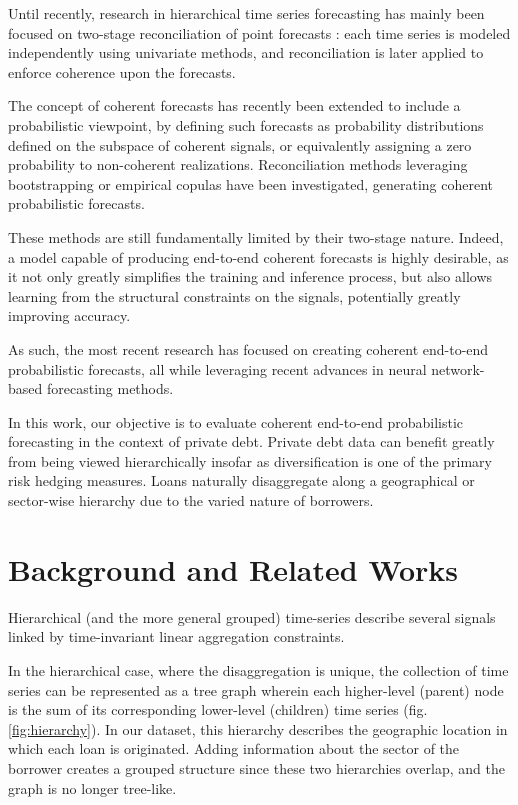 \documentclass[letterpaper]{article}
\begin{document}
Until recently, research in hierarchical time series forecasting has mainly been focused on two-stage reconciliation of point forecasts : each time series is modeled independently using univariate methods, and reconciliation is later applied to enforce coherence upon the forecasts.

The concept of coherent forecasts has recently been extended to include a probabilistic viewpoint, by defining such forecasts as probability distributions defined on the subspace of coherent signals, or equivalently assigning a zero probability to non-coherent realizations. 
Reconciliation methods leveraging bootstrapping \cite{Thesis} or empirical copulas \cite{PERMBU} have been investigated, generating coherent probabilistic forecasts.

These methods are still fundamentally limited by their two-stage nature. 
Indeed, a model capable of producing end-to-end coherent forecasts is highly desirable, as it not only greatly simplifies the training and inference process, but also allows learning from the structural constraints on the signals, potentially greatly improving accuracy. 

As such, the most recent research has focused on creating coherent end-to-end probabilistic forecasts, all while leveraging recent advances in neural network-based forecasting methods. 

In this work, our objective is to evaluate coherent end-to-end probabilistic forecasting in the context of private debt. 
Private debt data can benefit greatly from being viewed hierarchically insofar as diversification is one of the primary risk hedging measures.
Loans naturally disaggregate along a geographical or sector-wise hierarchy due to the varied nature of borrowers. 
 


\section{Background and Related Works}

Hierarchical (and the more general grouped) time-series describe several signals linked by time-invariant linear aggregation constraints.

In the hierarchical case, where the disaggregation is unique, the collection of time series can be represented as a tree graph wherein each higher-level (parent) node is the sum of its corresponding lower-level (children) time series (fig. \ref{fig:hierarchy}). 
In our dataset, this hierarchy describes the geographic location in which each loan is originated. Adding information about the sector of the borrower creates a grouped structure since these two hierarchies overlap, and the graph is no longer tree-like. 
\end{document}
